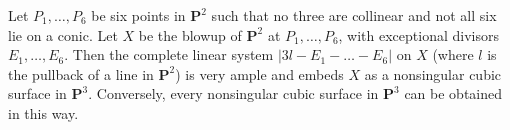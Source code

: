 Let $P_1, \ldots, P_6$ be six points in $\mathbf{P}^2$ such that no three are collinear and not all six lie on a conic. Let $X$ be the blowup of $\mathbf{P}^2$ at $P_1, \ldots, P_6$, with exceptional divisors $E_1, \ldots, E_6$. Then the complete linear system $|3l - E_1 - \ldots - E_6|$ on $X$ (where $l$ is the pullback of a line in $\mathbf{P}^2$) is very ample and embeds $X$ as a nonsingular cubic surface in $\mathbf{P}^3$. Conversely, every nonsingular cubic surface in $\mathbf{P}^3$ can be obtained in this way.
